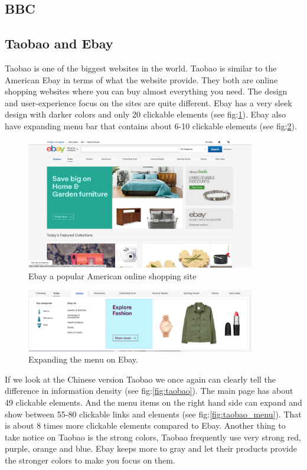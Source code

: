 \subsection{BBC}

\subsection{Taobao and Ebay}
Taobao is one of the biggest websites in the world. Taobao is similar to the American Ebay in terms of what the website provide. They both are online shopping websites where you can buy almost everything you need. The design and user-experience focus on the sites are quite different. Ebay has a very sleek design with darker colors and only 20 clickable elements (see fig:\ref{fig:ebay}). Ebay also have expanding menu bar that contains about 6-10 clickable elements (see fig:\ref{fig:ebay_menu}).

\begin{figure}[h]
\centering
\includegraphics[width=100mm]{Images/ebay.png}
\decoRule
\caption[ebay]{Ebay a popular American online shopping site}
\label{fig:ebay}
\end{figure}

\begin{figure}[h]
\centering
\includegraphics[width=100mm]{Images/ebay_menu.png}
\decoRule
\caption[Ebay's menu bar]{Expanding the menu on Ebay.}
\label{fig:ebay_menu}
\end{figure}

If we look at the Chinese version Taobao we once again can clearly tell the difference in information density (see fig:\ref{fig:taobao}). The main page has about 49 clickable elements. And the menu items on the right hand side can expand and show between 55-80 clickable links and elements (see fig:\ref{fig:taobao_menu}). That is about 8 times more clickable elements compared to Ebay. Another thing to take notice on Taobao is the strong colors, Taobao frequently use very strong red, purple, orange and blue. Ebay keeps more to gray and let their products provide the stronger colors to make you focus on them. 

